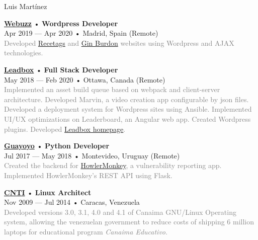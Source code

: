 \documentclass[12pt]{article}
\begin{document}
\begin{cv}{Luis Mart\'inez}
\begin{minipage}[t]{0.55\textwidth}
{    }\vspace{0.125em}
    \parbox[t]{\linewidth}{
      \textbf{\href{https://web.archive.org/web/20180413143616/https://webuzz.es/}{Webuzz}} • \textrm{\textbf{Wordpress Developer}}\\
      Apr 2019 --- Apr 2020 • Madrid, Spain (Remote)\\
      \footnotesize{\textcolor{gray}{Developed \href{https://web.archive.org/web/20201101021046/https://www.recetags.com/}{Recetags} and \href{https://web.archive.org/web/20191206145303/https://www.ginburdon.com/}{Gin Burdon} websites using Wordpress and AJAX technologies.}}\\
    }\vspace{0.125em}
    \parbox[t]{\linewidth}{
      \textbf{\href{https://leadboxhq.com}{Leadbox}} • \textrm{\textbf{Full Stack Developer}}\\
      May 2018 --- Feb 2020 • Ottawa, Canada (Remote)\\
      \footnotesize{\textcolor{gray}{Implemented an asset build queue based on webpack and client-server architecture. Developed Marvin, a video creation app configurable by json files. Developed a deployment system for Wordpress sites using Ansible. Implemented UI/UX optimizations on Leaderboard, an Angular web app. Created Wordpress plugins. Developed \href{https://leadboxhq.com}{Leadbox homepage}.}}\\
    }\vspace{0.125em}
    \parbox[t]{\linewidth}{
      \textbf{\href{https://guayoyo.io}{Guayoyo}} • \textrm{\textbf{Python Developer}}\\
      Jul 2017 --- May 2018 • Montevideo, Uruguay (Remote)\\
      \footnotesize{\textcolor{gray}{Created the backend for \href{https://howlermonkey.io}{HowlerMonkey}, a vulnerability reporting app. Implemented HowlerMonkey's REST API using Flask.}}\\
    }\vspace{0.125em}
    \parbox[t]{\linewidth}{
      \textbf{\href{https://www.cnti.gob.ve}{CNTI}} • \textrm{\textbf{Linux Architect}}\\
      Nov 2009 --- Jul 2014 • Caracas, Venezuela\\
      \footnotesize{\textcolor{gray}{Developed versions 3.0, 3.1, 4.0 and 4.1 of Canaima GNU/Linux Operating system, allowing the venezuelan government to reduce costs of shipping 6 million laptops for educational program \textsl{Canaima Educativo}.}}\\
    }
  \end{minipage}

\end{cv}
\end{document}
